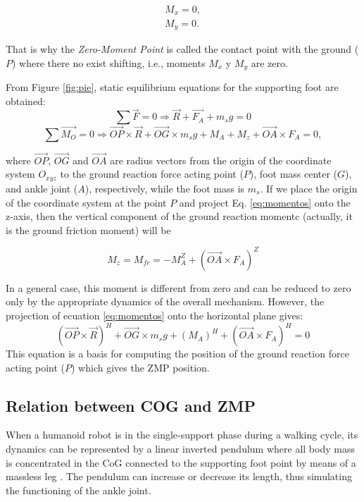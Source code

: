 \begin{align}
M_x = 0, \nonumber \\
M_y = 0.
\end{align}

That is why the \textit{Zero-Moment Point} is called the contact point with the ground ($P$) where there no exist shifting, i.e., moments $M_x$ y $M_y$ are zero.

From Figure \ref{fig:pie}, static equilibrium equations for the supporting foot are obtained:
\begin{equation}
\sum \overrightarrow{F} = 0 \Rightarrow \overrightarrow{R} + \overrightarrow{F_A} + m_s g = 0
\label{eq:fuerzas}
\end{equation}
\begin{equation}
\sum \overrightarrow{M_O} = 0 \Rightarrow \overrightarrow{OP} \times \overrightarrow{R} + \overrightarrow{OG} \times m_sg + M_A + M_z + \overrightarrow{OA} \times F_A = 0,
\label{eq:momentos}
\end{equation}

where $\overrightarrow{OP}$, $\overrightarrow{OG}$ and $\overrightarrow{OA}$ are radius vectors from the origin of the coordinate system $O_{xyz}$ to the ground reaction force acting point ($P$), foot mass center ($G$), and ankle joint ($A$), respectively, while the foot mass is $m_s$. If we place the origin of the coordinate system at the point $P$ and project Eq. \eqref{eq:momentos} onto the z-axis, then the vertical component of the ground reaction momentc (actually, it is the ground friction moment) will be

\begin{equation}
M_z = M_{fr} = -M_A^Z + (\overrightarrow{OA} \times F_A)^Z
\end{equation}

In a general case, this moment is different from zero and can be reduced to zero only by the appropriate dynamics of the overall mechanism. However, the projection of ecuation \eqref{eq:momentos} onto the horizontal plane gives:
\begin{equation}
(\overrightarrow{OP} \times \overrightarrow{R})^H + \overrightarrow{OG} \times m_sg + (M_A)^H + (\overrightarrow{OA} \times F_A)^H = 0
\label{eq:momentos}
\end{equation}
This equation is a basis for computing the position of the ground reaction force acting point ($P$) which gives the ZMP position.


\subsection{Relation between COG and ZMP}
When a humanoid robot is in the single-support phase during a walking cycle, its dynamics can be represented by a linear inverted pendulum where all body mass is concentrated in the CoG connected to the supporting foot point by means of a massless leg \cite{Kaj2001}. The pendulum can increase or decrease its length, thus simulating the functioning of the ankle joint.

